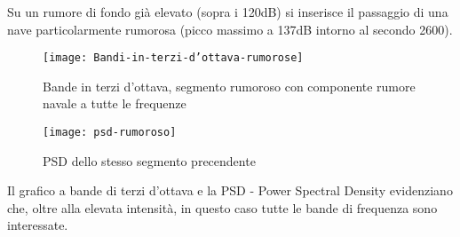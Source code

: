 Su un rumore di fondo già elevato (sopra i 120dB) si inserisce il passaggio di una nave particolarmente rumorosa (picco massimo a 137dB intorno al secondo 2600). 

\begin{figure}[h]
\centering
\texttt{[image: Bandi-in-terzi-d'ottava-rumorose]}
\caption{Bande in terzi d’ottava, segmento rumoroso con componente rumore navale a tutte le frequenze}
\end{figure}

\begin{figure}[h]
\centering
\texttt{[image: psd-rumoroso]}
\caption{PSD dello stesso segmento precendente}
\end{figure}

Il grafico a bande di terzi d’ottava e la PSD - Power Spectral Density evidenziano che, oltre alla elevata intensità, in questo caso tutte le bande di frequenza sono interessate. 














